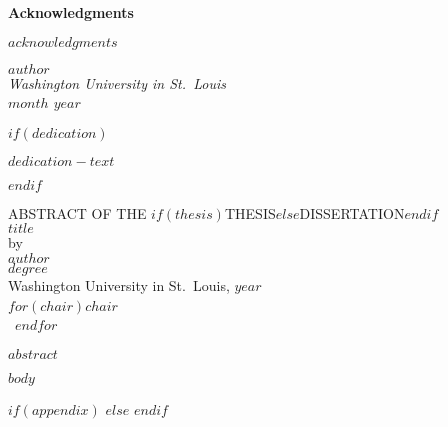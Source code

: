 \documentclass[12pt, oneside, openany]{book}
\begin{document}
\cleardoublepage
{}
{}
\listoftables

\cleardoublepage
{}
{}
\doublespacing
\begin{center}
    \textbf{\Huge Acknowledgments}
\end{center}

$acknowledgments$

\hfill $author$\\
\textit{Washington University in St.~Louis}\\
\textit{$month$ $year$}

$if(dedication)$
    \clearpage
    \null
    \vfill
    \begin{center}
        $dedication-text$
    \end{center}
    \vfill
$endif$

\cleardoublepage
{}
{}
\begin{center}
    ABSTRACT OF THE $if(thesis)$THESIS$else$DISSERTATION$endif$\\
    $title$\\
    by\\
    $author$\\
    $degree$\\
    Washington University in St.~Louis, $year$\\
    $for(chair)$$chair$~\\~$endfor$
\end{center}
$abstract$

\mainmatter

$body$

$if(appendix)$
$else$
\clearpage
\singlespacing
\setlength\bibitemsep{\baselineskip}
\printbibliography[heading=bibintoc]
$endif$
\end{document}
